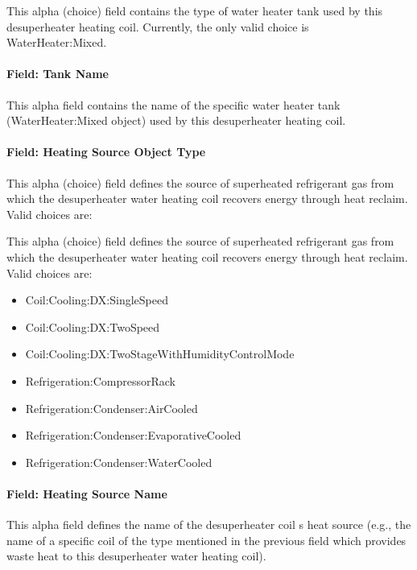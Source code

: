 This alpha (choice) field contains the type of water heater tank used by this desuperheater heating coil. Currently, the only valid choice is WaterHeater:Mixed.

\paragraph{Field: Tank Name}\label{field-tank-name}

This alpha field contains the name of the specific water heater tank (WaterHeater:Mixed object) used by this desuperheater heating coil.

\paragraph{Field: Heating Source Object Type}\label{field-heating-source-object-type-1}

This alpha (choice) field defines the source of superheated refrigerant gas from which the desuperheater water heating coil recovers energy through heat reclaim. Valid choices are:

This alpha (choice) field defines the source of superheated refrigerant gas from which the desuperheater water heating coil recovers energy through heat reclaim. Valid choices are:

\begin{itemize}
\item
  Coil:Cooling:DX:SingleSpeed
\item
  Coil:Cooling:DX:TwoSpeed
\item
  Coil:Cooling:DX:TwoStageWithHumidityControlMode
\item
  Refrigeration:CompressorRack
\item
  Refrigeration:Condenser:AirCooled
\item
  Refrigeration:Condenser:EvaporativeCooled
\item
  Refrigeration:Condenser:WaterCooled
\end{itemize}

\paragraph{Field: Heating Source Name}\label{field-heating-source-name-1}

This alpha field defines the name of the desuperheater coil s heat source (e.g., the name of a specific coil of the type mentioned in the previous field which provides waste heat to this desuperheater water heating coil).

